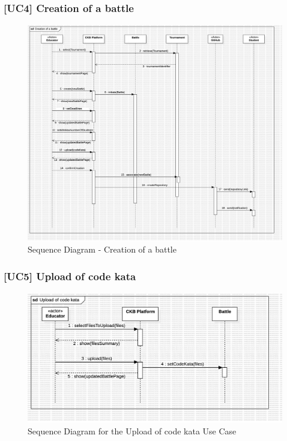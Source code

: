 \subsubsection*{[UC4] Creation of a battle}
\begin{figure}[H]
    \centering
    \includegraphics[width=\textwidth]{Diagrams/BattleCreation.jpg}
    \caption{Sequence Diagram - Creation of a battle}
    \label{fig:sequence-diagram-create-battle}
\end{figure}

\subsubsection*{[UC5] Upload of code kata}
\begin{figure}[H]
    \centering
    \includegraphics[width=\textwidth]{Diagrams/UC5SequenceDiagram.jpg}
    \caption{Sequence Diagram for the Upload of code kata Use Case}
    \label{fig:sequence-diagram-upload-code-kata}
\end{figure}

